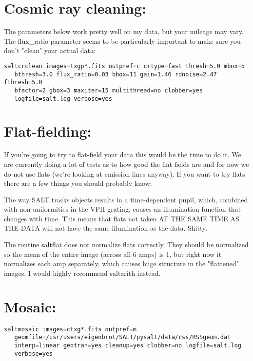 \documentclass[letter,11pt,oneside]{article}
\begin{document}
\section{Cosmic ray cleaning:}

The parameters below work pretty well on my data, but your mileage may
vary. The flux\_ratio parameter seems to be particularly important to
make sure you don't "clean" your actual data:

\begingroup \fontsize{10pt}{10pt}
\selectfont
\begin{verbatim} 
saltcrclean images=txgp*.fits outpref=c crtype=fast thresh=5.0 mbox=5
   bthresh=3.0 flux_ratio=0.03 bbox=11 gain=1.46 rdnoise=2.47 fthresh=5.0
   bfactor=2 gbox=3 maxiter=15 multithread=no clobber=yes
   logfile=salt.log verbose=yes
\end{verbatim}
\endgroup

\section{Flat-fielding:}

If you're going to try to flat-field your data this would be the time
to do it. We are currently doing a lot of tests as to how good the
flat fields are and for now we do not use flats (we're looking at
emission lines anyway). If you want to try flats there are a few
things you should probably know:

The way SALT tracks objects results in a time-dependent pupil, which,
combined with non-uniformities in the VPH grating, causes an
illumination function that changes with time. This means that flats
not taken AT THE SAME TIME AS THE DATA will not have the same
illumination as the data. Shitty.

The routine saltflat does not normalize flats correctly. They should
be normalized so the mean of the entire image (across all 6 amps) is
1, but right now it normalizes each amp separately, which causes huge
structure in the "flattened" images. I would highly recommend
saltarith instead.

\section{Mosaic:}

\begingroup \fontsize{10pt}{10pt}
\selectfont
\begin{verbatim} 
saltmosaic images=ctxg*.fits outpref=m
   geomfile=/usr/users/eigenbrot/SALT/pysalt/data/rss/RSSgeom.dat
   interp=linear geotran=yes cleanup=yes clobber=no logfile=salt.log
   verbose=yes
\end{verbatim}
\endgroup
\end{document}
